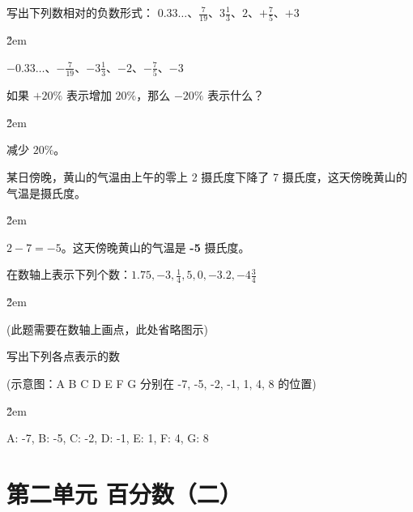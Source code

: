 \begin{example}
    写出下列数相对的负数形式：
    $0.33\dots$、$\frac{7}{19}$、$3\frac{1}{3}$、$2$、$+\frac{7}{5}$、$ +3$
\end{example}

\v{2em}

\begin{solution}
    $-0.33\dots$、$-\frac{7}{19}$、$-3\frac{1}{3}$、$-2$、$-\frac{7}{5}$、$-3$
\end{solution}

\begin{example}
    如果 $+20\%$ 表示增加 $20\%$，那么 $-20\%$ 表示什么？
\end{example}

\v{2em}

\begin{solution}
    减少 $20\%$。
\end{solution}

\begin{example}
    某日傍晚，黄山的气温由上午的零上 2 摄氏度下降了 7 摄氏度，这天傍晚黄山的气温是\underline{\hspace{1cm}}摄氏度。
\end{example}

\v{2em}

\begin{solution}
    $2 - 7 = -5$。这天傍晚黄山的气温是 \textbf{-5} 摄氏度。
\end{solution}

\begin{example}
    在数轴上表示下列个数：$1.75, -3, \frac{1}{4}, 5, 0, -3.2, -4\frac{3}{4}$
\end{example}

\v{2em}

\begin{solution}
    (此题需要在数轴上画点，此处省略图示)
\end{solution}

\begin{example}
    写出下列各点表示的数

    (示意图：A B C D E F G 分别在 -7, -5, -2, -1, 1, 4, 8 的位置)
\end{example}

\v{2em}

\begin{solution}
    A: -7, B: -5, C: -2, D: -1, E: 1, F: 4, G: 8
\end{solution}


\section*{第二单元 百分数（二）}

